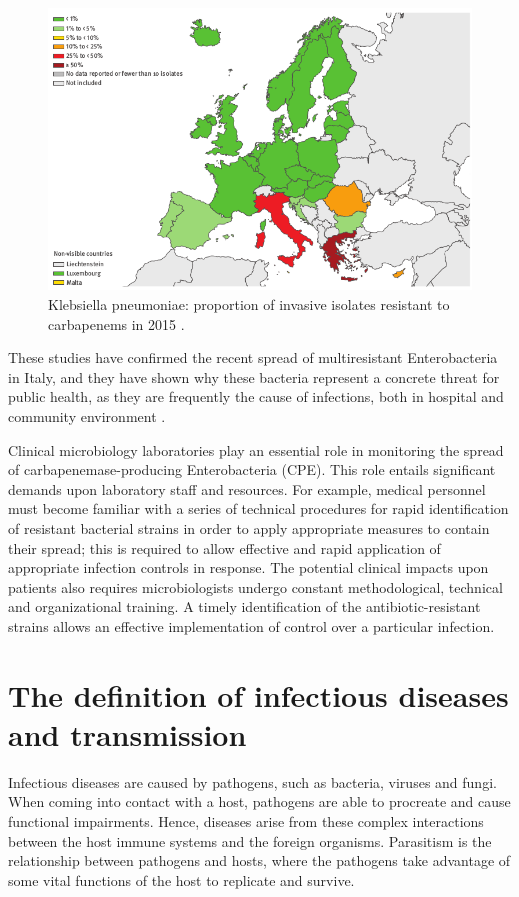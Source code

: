 \documentclass[11pt]{report}
\begin{document}
\clearpage
\begin{figure}[htp]
\centering
\includegraphics[scale=0.60]{img/K.pneu_2015.png}
\caption{Klebsiella pneumoniae: proportion of invasive isolates resistant to carbapenems in 2015 \cite{ECDC_Surveillance}.}
\label{}
\end{figure}

These studies have confirmed the recent spread of multiresistant Enterobacteria in Italy, and they have shown why these bacteria represent a concrete threat for public health, as they are frequently the cause of infections, both in hospital and community environment \cite{circolare2013}.

Clinical microbiology laboratories play an essential role in monitoring the spread of carbapenemase-producing Enterobacteria (CPE).
This role entails significant demands upon laboratory staff and resources.
For example, medical personnel must become familiar with a series of technical procedures for rapid identification of resistant bacterial strains in order to apply appropriate measures to contain their spread; this is required to allow effective and rapid application of appropriate infection controls in response.
The potential clinical impacts upon patients also requires microbiologists undergo constant methodological, technical and organizational training.
A timely identification of the antibiotic-resistant strains allows an effective implementation of control over a particular infection.

\section{The definition of infectious diseases and transmission}
Infectious diseases are caused by pathogens, such as bacteria, viruses and fungi.
When coming into contact with a host, pathogens are able to procreate and cause functional impairments.
Hence, diseases arise from these complex interactions between the host immune systems and the foreign organisms.
Parasitism is the relationship between pathogens and hosts, where the pathogens take advantage of some vital functions of the host to replicate and survive.
\end{document}
